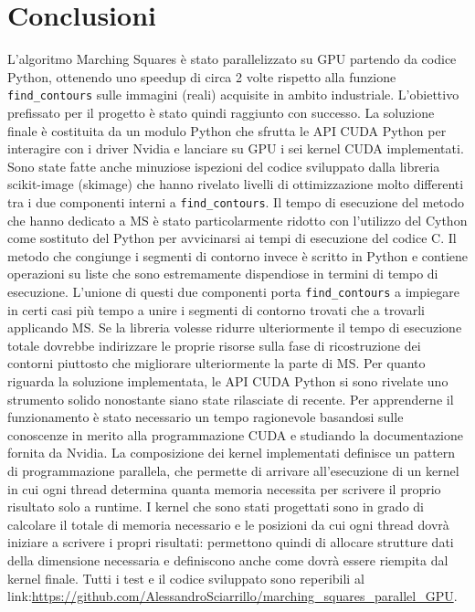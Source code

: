 \documentclass[12pt,a4paper]{report}
\begin{document}
{\chapter{Conclusioni}
L'algoritmo Marching Squares è stato parallelizzato su GPU partendo da codice Python, ottenendo uno speedup di circa 2 volte rispetto alla funzione \verb|find_contours| sulle immagini (reali) acquisite in ambito industriale.
L'obiettivo prefissato per il progetto è stato quindi raggiunto con successo. \newline
La soluzione finale è costituita da un modulo Python che sfrutta le API CUDA Python per interagire con i driver Nvidia e lanciare su GPU i sei kernel CUDA implementati.
Sono state fatte anche minuziose ispezioni del codice sviluppato dalla libreria scikit-image (skimage) che hanno rivelato livelli di ottimizzazione molto differenti tra i due componenti interni a \verb|find_contours|. Il tempo di esecuzione del metodo che hanno dedicato a MS è stato particolarmente ridotto con l'utilizzo del Cython come sostituto del Python per avvicinarsi ai tempi di esecuzione del codice C. Il metodo che congiunge i segmenti di contorno invece è scritto in Python e contiene operazioni su liste che sono estremamente dispendiose in termini di tempo di esecuzione. L'unione di questi due componenti porta \verb|find_contours| a impiegare in certi casi più tempo a unire i segmenti di contorno trovati che a trovarli applicando MS. Se la libreria volesse ridurre ulteriormente il tempo di esecuzione totale dovrebbe indirizzare le proprie risorse sulla fase di ricostruzione dei contorni piuttosto che migliorare ulteriormente la parte di MS. \newline
Per quanto riguarda la soluzione implementata, le API CUDA Python si sono rivelate uno strumento solido nonostante siano state rilasciate di recente. Per apprenderne il funzionamento è stato necessario un tempo ragionevole basandosi sulle conoscenze in merito alla programmazione CUDA e studiando la documentazione fornita da Nvidia.\newline
La composizione dei kernel implementati definisce un pattern di programmazione parallela, che permette di arrivare all'esecuzione di un kernel in cui ogni thread determina quanta memoria necessita per scrivere il proprio risultato solo a runtime. I kernel che sono stati progettati sono in grado di calcolare il totale di memoria necessario e le posizioni da cui ogni thread dovrà iniziare a scrivere i propri risultati: permettono quindi di allocare strutture dati della dimensione necessaria e definiscono anche come dovrà essere riempita dal kernel finale. \newline
Tutti i test e il codice sviluppato sono reperibili al link:\newline \url{https://github.com/AlessandroSciarrillo/marching_squares_parallel_GPU}.


}
\end{document}
